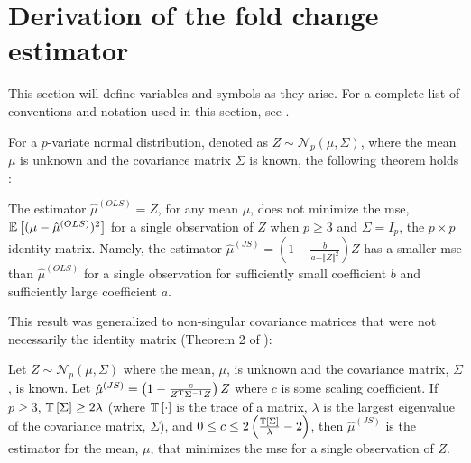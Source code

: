 \section{Derivation of the  fold change estimator}
\label{sec:JS_derivation}

This section will define variables and symbols as they arise.
For a complete list of conventions and notation used in this section, see .

For a $p$-variate normal distribution, denoted as $Z \sim \mathcal{N}_p(\mu, \Sigma)$, where the mean $\mu$ is unknown and the covariance matrix $\Sigma$ is known, the following theorem holds \cite{steinInadmissibilityUsualEstimator1956}:

\begin{theorem}
  The estimator $\hat{\mu}^{(OLS)} = Z$, for any mean $\mu$, does not minimize the \gls{mse}, $\mathbb{E} \left[ (\mu - \hat{\mu}^{(OLS)})^2 \right]$ for a single observation of $Z$ when $p \ge 3$ and $\Sigma = I_p$, the $p \times p$ identity matrix.
  Namely, the estimator $\hat{\mu}^{(JS)} = \left( 1 - \frac{b}{a + \Vert Z \Vert ^2}\right) Z$ has a smaller \gls{mse} than $\hat{\mu}^{(OLS)}$ for a single observation for sufficiently small coefficient $b$ and sufficiently large coefficient $a$.
\end{theorem}

This result was generalized to non-singular covariance matrices that were not necessarily the identity matrix (Theorem 2 of \cite[REF][]{bockMinimaxEstimatorsMean1975}):

\begin{theorem}
  Let $Z \sim \mathcal{N}_p \left(\mu, \Sigma \right)$ where the mean, $\mu$, is unknown and the covariance matrix, $\Sigma$, is known.
  Let $\hat{\mu}^{(JS)} = \left( 1 - \frac{c}{Z^{\mathrm{T}} \Sigma^{-1} Z}\right) Z$ where $c$ is some scaling coefficient.
  If $p \ge 3$, $\mathbb{T} \left[ \Sigma \right] \ge 2 \lambda$ (where $\mathbb{T} \left[ \cdot \right]$ is the trace of a matrix, $\lambda$ is the largest eigenvalue of the covariance matrix, $\Sigma$), and $0 \le c \le 2 \left( \frac{\mathbb{T} \left[ \Sigma \right]}{\lambda} - 2 \right)$, then $\hat{\mu}^{(JS)}$ is the estimator for the mean, $\mu$, that minimizes the \gls{mse} for a single observation of $Z$.
  \label{thm:js}
\end{theorem}

